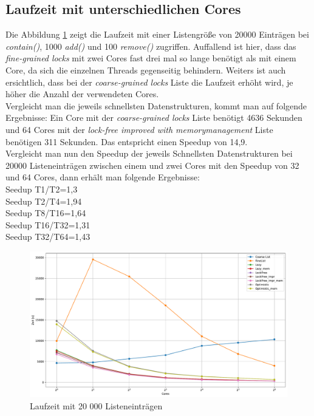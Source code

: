 \subsection{Laufzeit mit unterschiedlichen Cores}
\label{subsec:laufzeit}
Die Abbildung \ref{fig:mixed_time_cores_20000} zeigt die Laufzeit mit einer Listengröße von 20000 Einträgen bei
 \textit{contain()}, 1000 \textit{add()} und 100 \textit{remove()} zugriffen.
 Auffallend ist hier, dass
 das \textit{fine-grained locks} mit zwei Cores fast drei mal so lange benötigt als mit einem Core, da sich die einzelnen
 Threads gegenseitig behindern. 
 Weiters ist auch ersichtlich, dass bei der \textit{coarse-grained locks} Liste die Laufzeit erhöht wird, je höher
 die Anzahl der verwendeten Cores.\\
 Vergleicht man die jeweils schnellsten Datenstrukturen, kommt man auf folgende Ergebnisse:
 Ein Core mit der \textit{coarse-grained locks} Liste benötigt 4636 Sekunden und 64 Cores mit der \textit{lock-free improved with memorymanagement} Liste benötigen 311 Sekunden.
 Das entspricht einen Speedup von 14,9. \\
 Vergleicht man nun den Speedup der jeweils Schnellsten Datenstrukturen bei 20000 Listeneinträgen zwischen einem und zwei Cores mit den Speedup von 32 und 64 Cores, 
 dann erhält man folgende Ergebnisse:
 \\Seedup T1/T2=1,3 
 \\Seedup T2/T4=1,94 
 \\Seedup T8/T16=1,64 
 \\Seedup T16/T32=1,31
 \\Seedup T32/T64=1,43

 \begin{figure}[H]
	\centering
	\includegraphics[width=1.0\linewidth]{./plots_pdf/mixed_time_cores_20000.pdf} 
	\caption{Laufzeit mit 20 000 Listeneinträgen} 
	\label{fig:mixed_time_cores_20000} 
\end{figure}


